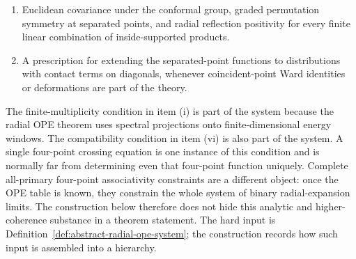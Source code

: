 \begin{definition}
\begin{enumerate}[label=(\roman*)]
  domain after the canonical permutation and tensor-index identifications.
  For four-point functions this condition is crossing, namely equality of two
  binary radial-expansion limits tested between exterior states.  For
  higher-point functions it is the equality of all iterated OPE
  parenthesizations on their common radial domains.  A separate coherence
  theorem may allow the higher-point identities to be derived from a smaller
  list of associativity identities; absent such a theorem, the all-tree
  compatibility is part of the system.
  \item Euclidean covariance under the conformal group, graded permutation
  symmetry at separated points, and radial reflection positivity for every
  finite linear combination of inside-supported products.
  \item A prescription for extending the separated-point functions to
  distributions with contact terms on diagonals, whenever coincident-point
  Ward identities or deformations are part of the theory.
\end{enumerate}
\end{definition}

The finite-multiplicity condition in item (i) is part of the system because
the radial OPE theorem uses spectral projections onto finite-dimensional
energy windows.  The compatibility condition in item (vi) is also part of the
system.  A single four-point crossing equation is one instance of this
condition and is normally far from determining even that four-point function
uniquely.  Complete all-primary four-point associativity constraints are a
different object: once the OPE table is known, they constrain the whole
system of binary radial-expansion limits.  The construction below therefore
does not hide this analytic and higher-coherence substance in a theorem
statement.  The hard input is Definition~\ref{def:abstract-radial-ope-system};
the construction records how such input is assembled into a hierarchy.

